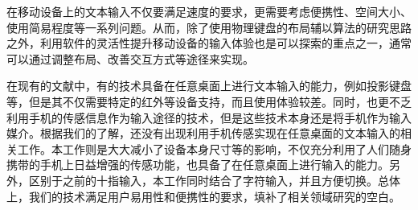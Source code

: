 在移动设备上的文本输入不仅要满足速度的要求，更需要考虑便携性、空间大小、使用简易程度等一系列问题。从而，除了使用物理键盘的布局辅以算法的研究思路之外，利用软件的灵活性提升移动设备的输入体验也是可以探索的重点之一，通常可以通过调整布局、改善交互方式等途径来实现。

在现有的文献中，有的技术具备在任意桌面上进行文本输入的能力，例如投影键盘等，但是其不仅需要特定的红外等设备支持，而且使用体验较差。同时，也更不乏利用手机的传感信息作为输入途径的技术，但是这些技术本身还是将手机作为输入媒介。根据我们的了解，还没有出现利用手机传感实现在任意桌面的文本输入的相关工作。本工作则是大大减小了设备本身尺寸等的影响，不仅充分利用了人们随身携带的手机上日益增强的传感功能，也具备了在任意桌面上进行输入的能力。另外，区别于之前的十指输入，本工作同时结合了字符输入，并且方便切换。总体上，我们的技术满足用户易用性和便携性的要求，填补了相关领域研究的空白。